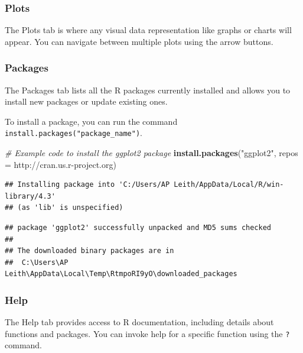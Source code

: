 \documentclass[
  b5paper]{book}
\newenvironment{Shaded}{\begin{snugshade}}{\end{snugshade}}
\newcommand{\AttributeTok}[1]{\textcolor[rgb]{0.13,0.29,0.53}{#1}}
\newcommand{\CommentTok}[1]{\textcolor[rgb]{0.56,0.35,0.01}{\textit{#1}}}
\newcommand{\FunctionTok}[1]{\textcolor[rgb]{0.13,0.29,0.53}{\textbf{#1}}}
\newcommand{\NormalTok}[1]{#1}
\newcommand{\StringTok}[1]{\textcolor[rgb]{0.31,0.60,0.02}{#1}}
\begin{document}
\hypertarget{plots}{%
\subsubsection*{Plots}\label{plots}}

The Plots tab is where any visual data representation like graphs or charts will appear. You can navigate between multiple plots using the arrow buttons.

\hypertarget{packages}{%
\subsubsection*{Packages}\label{packages}}

The Packages tab lists all the R packages currently installed and allows you to install new packages or update existing ones.

To install a package, you can run the command \texttt{install.packages("package\_name")}.

\begin{Shaded}
\begin{Highlighting}[]
\CommentTok{\# Example code to install the \textquotesingle{}ggplot2\textquotesingle{} package }
\FunctionTok{install.packages}\NormalTok{(}\StringTok{"ggplot2"}\NormalTok{, }\AttributeTok{repos =} \StringTok{\textquotesingle{}http://cran.us.r{-}project.org\textquotesingle{}}\NormalTok{)}
\end{Highlighting}
\end{Shaded}

\begin{verbatim}
## Installing package into 'C:/Users/AP Leith/AppData/Local/R/win-library/4.3'
## (as 'lib' is unspecified)
\end{verbatim}

\begin{verbatim}
## package 'ggplot2' successfully unpacked and MD5 sums checked
## 
## The downloaded binary packages are in
##  C:\Users\AP Leith\AppData\Local\Temp\RtmpoRI9yO\downloaded_packages
\end{verbatim}

\hypertarget{help}{%
\subsubsection*{Help}\label{help}}

The Help tab provides access to R documentation, including details about functions and packages. You can invoke help for a specific function using the \texttt{?} command.
\end{document}
